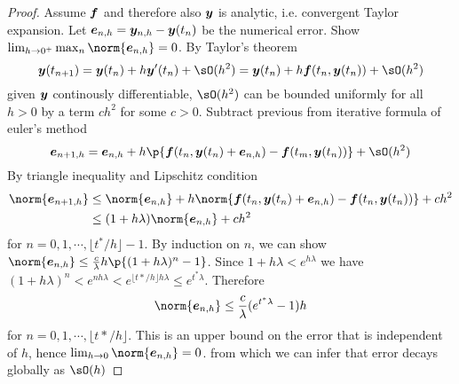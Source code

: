 \documentclass[11pt]{article}
\begin{document}
\begin{theorem*}
    \begin{proof}
        Assume $\bf$ and therefore also $\by$ is analytic, i.e. convergent Taylor expansion. Let $\be_{n,h} = \by_{n,h} - \by(t_n)$ be the numerical error. Show $\lim_{h\to 0^+} \max_n \norm{\be_{n,h}} = 0$. By Taylor's theorem 
        \[
            \by(t_{n+1})
            = \by(t_n) + h\by'(t_n) + \sO(h^2)
            = \by(t_n) + h\bf(t_n,\by(t_n)) + \sO(h^2)
        \]
        given $\by$ continously differentiable, $\sO(h^2)$ can be bounded uniformly for all $h>0$ by a term $ch^2$ for some $c>0$. Subtract previous from iterative formula of euler's method 
        \[
            \be_{n+1,h} = 
            \be_{n,h} + h\p{
                \bf(t_n, \by(t_n) + \be_{n,h}) - \bf(t_m, \by(t_n))
            } + \sO(h^2)
        \]
        By triangle inequality and Lipschitz condition 
        \begin{align*}
            \norm{\be_{n+1, h}}
            &\leq \norm{\be_{n,h}} + h\norm{\bf(t_n, \by(t_n) + \be_{n,h}) - \bf(t_n, \by(t_n))} + ch^2 \\
            &\leq (1+h\lambda) \norm{\be_{n,h}} + ch^2
        \end{align*}
        for $n=0,1,\cdots,\lfloor t^*/h \rfloor - 1$. By induction on $n$, we can show $\norm{\be_{n,h}} \leq \frac{c}{\lambda} h \p{(1+h\lambda)^n - 1}$. Since $1+h\lambda < e^{h\lambda}$ we have $(1+h\lambda)^n < e^{nh\lambda} < e^{\lfloor t*/h\rfloor h\lambda} \leq e^{t^* \lambda}$. Therefore 
        \[
            \norm{\be_{n,h}}   \leq \frac{c}{\lambda} (e^{t^*\lambda} - 1)h
        \]
        for $n=0,1,\cdots,\lfloor t*/h\rfloor$. This is an upper bound on the error that is independent of $h$, hence $\lim_{h\to 0} \norm{\be_{n,h}} = 0$. from which we can infer that error decays globally as $\sO(h)$
    \end{proof}
\end{theorem*}
\end{document}
